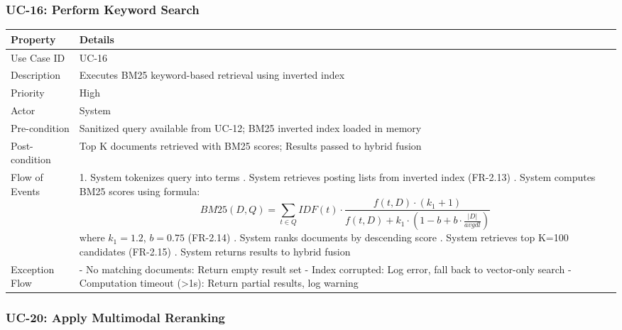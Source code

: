 \subsubsection*{UC-16: Perform Keyword Search}

\begin{table}[H]
\small
\begin{tabularx}{\textwidth}{|p{}|X|}
\hline
\textbf{Property} & \textbf{Details} \\
\hline
Use Case ID & UC-16 \\
\hline
Description & Executes BM25 keyword-based retrieval using inverted index \\
\hline
Priority & High \\
\hline
Actor & System \\
\hline
Pre-condition & Sanitized query available from UC-12; BM25 inverted index loaded in memory \\
\hline
Post-condition & Top K documents retrieved with BM25 scores; Results passed to hybrid fusion \\
\hline
Flow of Events & 1. System tokenizes query into terms \newline 2. System retrieves posting lists from inverted index (FR-2.13) \newline 3. System computes BM25 scores using formula: $$BM25(D,Q) = \sum_{t \in Q} IDF(t) \cdot \frac{f(t,D) \cdot (k_1 + 1)}{f(t,D) + k_1 \cdot (1 - b + b \cdot \frac{|D|}{avgdl})}$$ where $k_1=1.2$, $b=0.75$ (FR-2.14) \newline 4. System ranks documents by descending score \newline 5. System retrieves top K=100 candidates (FR-2.15) \newline 6. System returns results to hybrid fusion \\
\hline
Exception Flow & - No matching documents: Return empty result set \newline - Index corrupted: Log error, fall back to vector-only search \newline - Computation timeout (>1s): Return partial results, log warning \\
\hline
\end{tabularx}
\end{table}

\subsubsection*{UC-20: Apply Multimodal Reranking}


